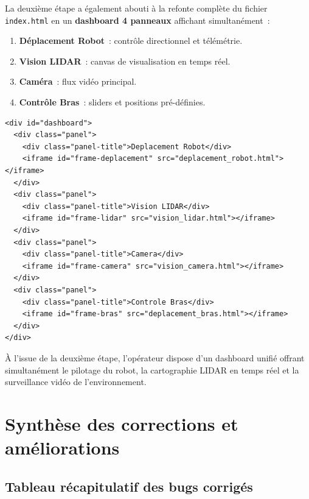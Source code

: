\documentclass[12pt,a4paper]{report}
\begin{document}
La deuxième étape a également abouti à la refonte complète du fichier \texttt{index.html} en un \textbf{dashboard 4 panneaux} affichant simultanément~:

\begin{enumerate}
  \item \textbf{Déplacement Robot}~: contrôle directionnel et télémétrie.
  \item \textbf{Vision LIDAR}~: canvas de visualisation en temps réel.
  \item \textbf{Caméra}~: flux vidéo principal.
  \item \textbf{Contrôle Bras}~: sliders et positions pré-définies.
\end{enumerate}

\begin{lstlisting}[language=HTML5, caption={Structure du dashboard 4 panneaux (index.html)}]
<div id="dashboard">
  <div class="panel">
    <div class="panel-title">Deplacement Robot</div>
    <iframe id="frame-deplacement" src="deplacement_robot.html"></iframe>
  </div>
  <div class="panel">
    <div class="panel-title">Vision LIDAR</div>
    <iframe id="frame-lidar" src="vision_lidar.html"></iframe>
  </div>
  <div class="panel">
    <div class="panel-title">Camera</div>
    <iframe id="frame-camera" src="vision_camera.html"></iframe>
  </div>
  <div class="panel">
    <div class="panel-title">Controle Bras</div>
    <iframe id="frame-bras" src="deplacement_bras.html"></iframe>
  </div>
</div>
\end{lstlisting}

\begin{successbox}
À l'issue de la deuxième étape, l'opérateur dispose d'un dashboard unifié offrant simultanément le pilotage du robot, la cartographie LIDAR en temps réel et la surveillance vidéo de l'environnement.
\end{successbox}

\chapter{Synthèse des corrections et améliorations}

\section{Tableau récapitulatif des bugs corrigés}
\end{document}
